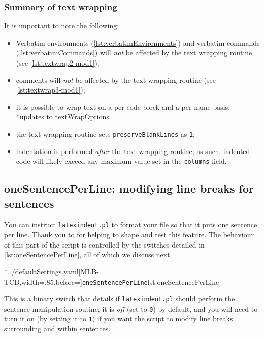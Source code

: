 \subsubsection{Summary of text wrapping}
	It is important to note the following:
	\begin{itemize}
		\item Verbatim environments (\vref{lst:verbatimEnvironments}) and verbatim commands
		      (\vref{lst:verbatimCommands}) will \emph{not} be affected by the text
		      wrapping routine (see \vref{lst:textwrap2-mod1});
		\item comments will \emph{not} be affected by the text wrapping routine (see
		      \vref{lst:textwrap3-mod1});
		\item it is possible to wrap text on a per-code-block and a per-name basis;
		      *{updates to textWrapOptions}
		\item the text wrapping routine sets \texttt{preserveBlankLines} as
		      \texttt{1};
		\item indentation is performed \emph{after} the text wrapping routine; as such,
		      indented code will likely exceed any maximum value set in the \texttt{columns}
		      field.
	\end{itemize}

\subsection{oneSentencePerLine: modifying line breaks for sentences}\label{sec:onesentenceperline}
	You can instruct \texttt{latexindent.pl} to
	format%
	 your file so that
	it puts one sentence per line. Thank you to \cite{mlep} for helping to
	shape and test this feature. The behaviour of this part of the script is controlled by
	the switches detailed in \cref{lst:oneSentencePerLine}, all of which we discuss next.

	\cmhlistingsfromfile[style=oneSentencePerLine]*{../defaultSettings.yaml}[MLB-TCB,width=.85\linewidth,before=\centering]{\texttt{oneSentencePerLine}}{lst:oneSentencePerLine}

	This is a binary switch that details if \texttt{latexindent.pl} should perform the
	sentence manipulation routine; it is \emph{off} (set to \texttt{0}) by default, and you will
	need to turn it on (by setting it to \texttt{1}) if you want the script
	to modify line breaks surrounding and within sentences.

